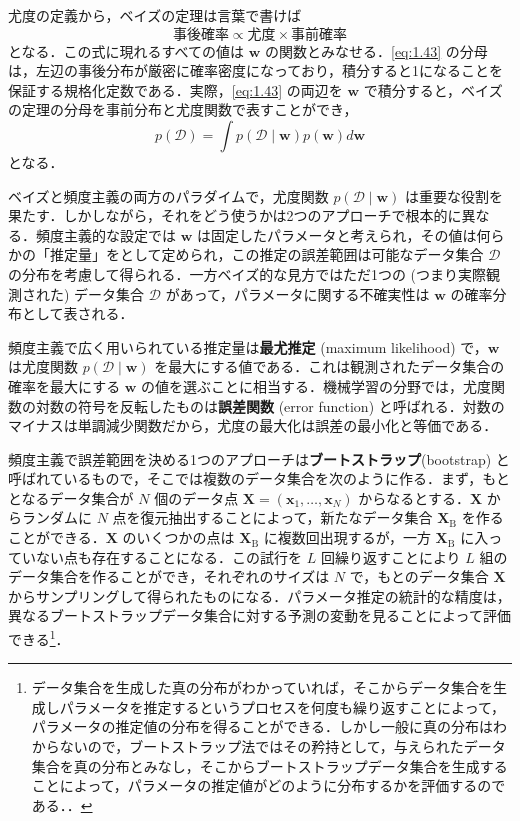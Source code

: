 \documentclass[uplatex,a4paper,oneside,openany,dvipdfmx]{jsarticle}
\numberwithin{equation}{section}
\theoremstyle{mystyle} %
\newcommand{\CD}{\mathcal{D}}
\newcommand{\mb}[1]{\mathbf{#1}}
\newcommand{\tb}[1]{\textbf{#1}}
\newcommand{\bs}[1]{\boldsymbol{#1}}
\begin{document}
尤度の定義から，ベイズの定理は言葉で書けば
\begin{equation} \label{eq:1.44}
    \text{事後確率} \propto \text{尤度} \times \text{事前確率}
\end{equation}
となる．この式に現れるすべての値は $\bs{w}$ の関数とみなせる．\eqref{eq:1.43} の分母は，左辺の事後分布が厳密に確率密度になっており，積分すると1になることを保証する規格化定数である．実際，\eqref{eq:1.43} の両辺を $\bs{w}$ で積分すると，ベイズの定理の分母を事前分布と尤度関数で表すことができ，
\begin{equation} \label{eq:1.45}
    p(\CD) = \int p(\CD \mid \bs{w}) p(\bs{w}) d\bs{w}
\end{equation}
となる．

ベイズと頻度主義の両方のパラダイムで，尤度関数 $p(\CD \mid \bs{w})$ は重要な役割を果たす．しかしながら，それをどう使うかは2つのアプローチで根本的に異なる．頻度主義的な設定では $\bs{w}$ は固定したパラメータと考えられ，その値は何らかの「推定量」をとして定められ，この推定の誤差範囲は可能なデータ集合 $\CD$ の分布を考慮して得られる．一方ベイズ的な見方ではただ1つの (つまり実際観測された) データ集合 $\CD$ があって，パラメータに関する不確実性は $\bs{w}$ の確率分布として表される．

頻度主義で広く用いられている推定量は\tb{最尤推定} (maximum likelihood) で，$\bs{w}$ は尤度関数 $p(\CD \mid \bs{w})$ を最大にする値である．これは観測されたデータ集合の確率を最大にする $\bs{w}$ の値を選ぶことに相当する．機械学習の分野では，尤度関数の対数の符号を反転したものは\tb{誤差関数} (error function) と呼ばれる．対数のマイナスは単調減少関数だから，尤度の最大化は誤差の最小化と等価である．

頻度主義で誤差範囲を決める1つのアプローチは\tb{ブートストラップ}(bootstrap) と呼ばれているもので，そこでは複数のデータ集合を次のように作る．まず，もととなるデータ集合が $N$ 個のデータ点 $\mb{X} = (\bs{x}_{1},\ldots,\bs{x}_{N})$ からなるとする．$\mb{X}$ からランダムに $N$ 点を復元抽出することによって，新たなデータ集合 $\mb{X}_{\text{B}}$ を作ることができる．$\mb{X}$ のいくつかの点は $\mb{X}_{\text{B}}$ に複数回出現するが，一方 $\mb{X}_{\text{B}}$ に入っていない点も存在することになる．この試行を $L$ 回繰り返すことにより $L$ 組のデータ集合を作ることができ，それぞれのサイズは $N$ で，もとのデータ集合 $\bs{X}$ からサンプリングして得られたものになる．パラメータ推定の統計的な精度は，異なるブートストラップデータ集合に対する予測の変動を見ることによって評価できる\footnote{データ集合を生成した真の分布がわかっていれば，そこからデータ集合を生成しパラメータを推定するというプロセスを何度も繰り返すことによって，パラメータの推定値の分布を得ることができる．しかし一般に真の分布はわからないので，ブートストラップ法ではその矜持として，与えられたデータ集合を真の分布とみなし，そこからブートストラップデータ集合を生成することによって，パラメータの推定値がどのように分布するかを評価するのである．．}．
\end{document}
